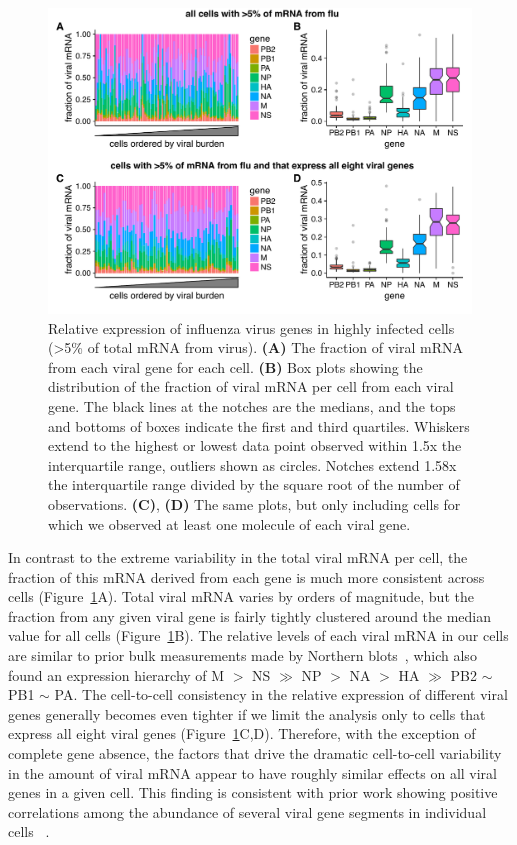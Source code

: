 \documentclass[9pt,lineno]{elife}
\begin{document}
\begin{figure}
\centerline{\includegraphics[width=0.9\linewidth]{figures/p_flu_expr_aledit.pdf}}
\caption{\label{fig:fluexpr}
Relative expression of influenza virus genes in highly infected cells (>5\% of total mRNA from virus).
{\bf (A)} 
The fraction of viral mRNA from each viral gene for each cell. 
{\bf (B)}
Box plots showing the distribution of the fraction of viral mRNA per cell from each viral gene.
The black lines at the notches are the medians, and the tops and bottoms of boxes indicate the first and third quartiles.
Whiskers extend to the highest or lowest data point observed within 1.5x the interquartile range, outliers shown as circles.
Notches extend 1.58x the interquartile range divided by the square root of the number of observations. 
{\bf (C)}, {\bf (D)} 
The same plots, but only including cells for which we observed at least one molecule of each viral gene.
}
\end{figure}

In contrast to the extreme variability in the total viral mRNA per cell, the fraction of this mRNA derived from each gene is much more consistent across cells (Figure~\ref{fig:fluexpr}A).
Total viral mRNA varies by orders of magnitude, but the fraction from any given viral gene is fairly tightly clustered around the median value for all cells (Figure~\ref{fig:fluexpr}B).
The relative levels of each viral mRNA in our cells are similar to prior bulk measurements made by Northern blots~\citep{Hatada:1989vz}, which also found an expression hierarchy of M $>$ NS $\gg$ NP $>$ NA $>$ HA $\gg$ PB2 $\sim$ PB1 $\sim$ PA.
The cell-to-cell consistency in the relative expression of different viral genes generally becomes even tighter if we limit the analysis only to cells that express all eight viral genes (Figure~\ref{fig:fluexpr}C,D).
Therefore, with the exception of complete gene absence, the factors that drive the dramatic cell-to-cell variability in the amount of viral mRNA appear to have roughly similar effects on all viral genes in a given cell.
This finding is consistent with prior work showing positive correlations among the abundance of several viral gene segments in individual cells ~\citep{Heldt:2015iz}.
\end{document}
